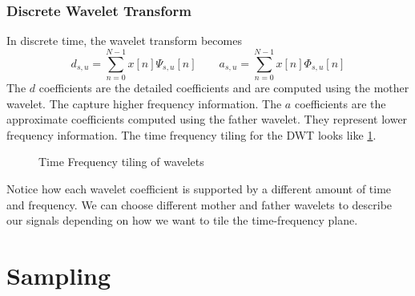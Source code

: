 \subsubsection{Discrete Wavelet Transform}
In discrete time, the wavelet transform becomes
\[
  d_{s,u}=\sum_{n=0}^{N-1}x[n]\Psi_{s,u}[n] \qquad a_{s,u}=\sum_{n=0}^{N-1}x[n]\Phi_{s,u}[n]
\]
The $d$ coefficients are the detailed coefficients and are computed using the mother wavelet. The capture higher frequency information.
The $a$ coefficients are the approximate coefficients computed using the father wavelet. They represent lower frequency information.
The time frequency tiling for the DWT looks like \cref{fig:wavelet-tiling}.
\begin{gitbook-image}
\begin{figure}[!h]
  \centering
  \caption{Time Frequency tiling of wavelets}
  \label{fig:wavelet-tiling}
\end{figure}
\end{gitbook-image}
Notice how each wavelet coefficient is supported by a different amount of time and frequency.
We can choose different mother and father wavelets to describe our signals depending on how we want to tile the time-frequency plane.
\section{Sampling}
